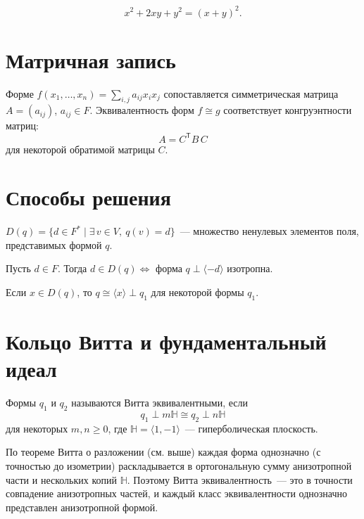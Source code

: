 \documentclass[12pt]{article}
\begin{document}
    \begin{example}
        \[
        x^2 + 2xy + y^2 = (x + y)^2.
        \]
    \end{example}
    
    \section{Матричная запись}
    
    Форме $f(x_1, \dots, x_n)=\sum\limits_{i, j} a_{ij} x_i x_j$ сопоставляется симметрическая матрица $A=(a_{ij})$, $a_{ij} \in F$. Эквивалентность форм $f \cong g$ соответствует конгруэнтности матриц:
    \[
    A = C^{\mathsf T} B\, C
    \]
    для некоторой обратимой матрицы $C$.
    
    \section{Способы решения}
	
	\begin{definition}
		$D(q) = \{ d \in F^* \mid \exists\, v \in V,\ q(v) = d \}$~--- множество ненулевых элементов поля, представимых формой $q$.
	\end{definition}
	
	\begin{statement}
		Пусть $d \in F$. Тогда $d \in D(q) \Leftrightarrow$ форма $q \perp \langle -d \rangle$ изотропна.
	\end{statement}
	
	\begin{statement}
		Если $x \in D(q)$, то $q \cong \langle x \rangle \perp q_1$ для некоторой формы $q_1$.
	\end{statement}
	
	\section{Кольцо Витта и фундаментальный идеал}
	
	\begin{definition}
		Формы $q_1$ и $q_2$ называются Витта эквивалентными, если
		\[
		q_1 \perp m \mathbb{H} \cong q_2 \perp n \mathbb{H}
		\]
		для некоторых $m, n \geqslant 0$, где $\mathbb{H} = \langle 1, -1 \rangle$~--- гиперболическая плоскость.
	\end{definition}
	
	По теореме Витта о разложении (см. выше) каждая форма однозначно (с точностью до изометрии) раскладывается в ортогональную сумму анизотропной части и нескольких копий $\mathbb{H}$. Поэтому Витта эквивалентность~--- это в точности совпадение анизотропных частей, и каждый класс эквивалентности однозначно представлен анизотропной формой.
	
\end{document}
